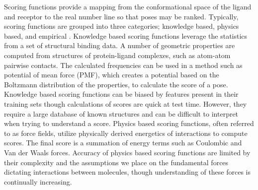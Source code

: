 \documentclass[journal=jcisd8,manuscript=article]{achemso}
\begin{document}
Scoring functions provide a mapping from the conformational space of the ligand and receptor to the real number line so that poses may be ranked. Typically, scoring functions are grouped into three categories; knowledge based, physics based, and empirical \cite{kitchen2004docking}. Knowledge based scoring functions leverage the statistics from a set of structural binding data. A number of geometric properties are computed from structures of protein-ligand complexes, such as atom-atom pairwise contacts. The calculated frequencies can be used in a method such as potential of mean force (PMF), which creates a potential based on the Boltzmann distribution of the properties, to calculate the score of a pose\cite{muegge1999general,muegge2000knowledge}. Knowledge based scoring functions can be biased by features present in their training sets though calculations of scores are quick at test time\cite{kitchen2004docking}. However, they require a large database of known structures and can be difficult to interpret when trying to understand a score\cite{brooijmans2003molecular}. Physics based scoring functions, often referred to as force fields, utilize physically derived energetics of interactions to compute scores. The final score is a summation of energy terms such as Coulombic and Van der Waals forces\cite{huang2006molecular}. Accuracy of physics based scoring functions are limited by their complexity and the assumptions we place on the fundamental forces dictating interactions between molecules, though understanding of these forces is continually increasing\cite{liu2015classification}. 
\end{document}
